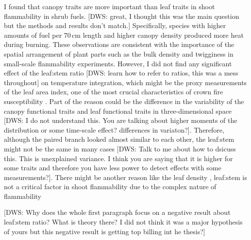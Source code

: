 \documentclass[12pt]{report}
\begin{document}
I found that canopy traits are more important than leaf traits in shoot flammability in shrub fuels. [DWS: great, I thought this was the main question but the methods and results don't match.]
Specifically, species with higher amounts of fuel per 70\,cm length and higher canopy density produced more heat during burning. These observations are consistent with the importance of the spatial arrangement of plant parts such as the bulk density \citep{pausas2012fire} and twigginess \citep{potts2022growth} in small-scale flammability experiments. However, I did not find any significant effect of the leaf:stem ratio [DWS: learn how to refer to ratios, this was a mess throughout] on temperature integration, which might be the proxy measurements of the leaf area index, one of the most crucial characteristics of crown fire susceptibility \citep{ray2005micrometeorological}. Part of the reason could be the difference in the variability of the canopy functional traits and leaf functional traits in three-dimensional space \citep{kamoske2021leaf} [DWS: I do not understand this. You are talking about higher moments of the distribution or some time-scale effect? differences in variaton?]. Therefore, although the paired branch looked almost similar to each other, the leaf:stem might not be the same in many cases  [DWS: Talk to me about how to dsicuss this. This is unexplained variance. I think you are saying that it is higher for some traits and therefore you have less power to detect effects with some measurements?]. There might be another reason like the leaf density \citep{potts2022growth}, leaf:stem is not a critical factor in shoot flammability due to the complex nature of flammability

[DWS: Why does the whole first paragraph focus on a negative result about leaf:stem ratio? What is theory there? I did not think it was a major hypothesis of yours but this negative result is getting top billing int he thesis?]
\end{document}

